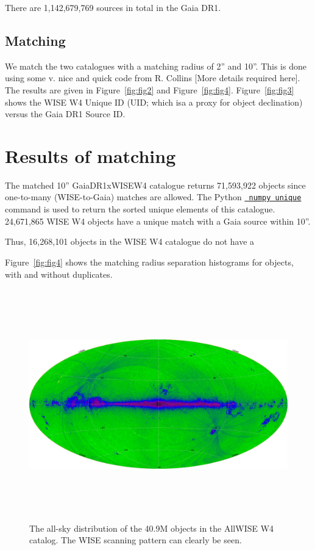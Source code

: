 \documentclass[11pt,a4paper]{article}
\begin{document}
{{    There are 1,142,679,769 sources in total in the Gaia DR1. 



    \subsection{Matching}
    We match the two catalogues with a matching radius of 2'' and 10''. 
    This is done using some v. nice and quick code from R. Collins [More details required here]. 
    The results are given in Figure~\ref{fig:fig2} and Figure~\ref{fig:fig4}. 
    Figure~\ref{fig:fig3} shows the WISE W4 Unique ID (UID; which isa a proxy for object declination) 
    versus the Gaia DR1 Source ID. 


\section{Results of matching}
The matched 10'' GaiaDR1xWISEW4 catalogue returns 71,593,922 objects
since one-to-many (WISE-to-Gaia) matches are allowed. The Python
\href{https://docs.scipy.org/doc/numpy/reference/generated/numpy.unique.html}{{\tt
numpy unique}} command is used to return the sorted unique elements of
this catalogue. 24,671,865 WISE W4 objects have a unique match with a
Gaia source within 10''. 

Thus, 16,268,101 objects in the WISE W4 catalogue do not have a

Figure~\ref{fig:fig4} shows the matching radius separation histograms for objects, 
with and without duplicates. 


\begin{figure}
    \includegraphics[height=10.0cm,width=16.0cm]
    {../../Gaia/plots/WISE_W4_DetBitge8_Aittoff_Galactic.png}
    \caption[The all-sky distribution of the 40.9M objects in the AllWISE W4 catalog.]
    {The all-sky distribution of the 40.9M objects in the AllWISE W4 catalog.
    The WISE scanning pattern can clearly be seen.}
    \label{fig:fig1}
\end{figure}


}}
\end{document}

